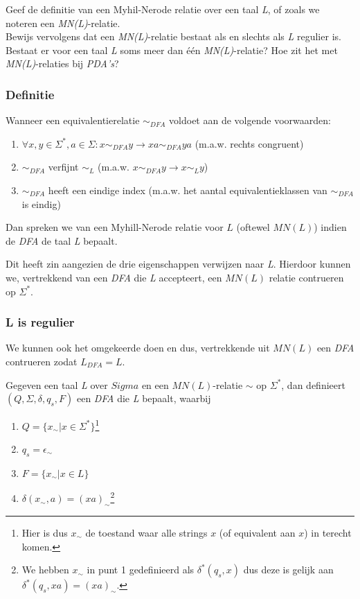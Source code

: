 
\begin{quest}[Vraag 5]
  Geef de definitie van een Myhil-Nerode relatie over een taal \emph{L}, of zoals we noteren een \emph{MN(L)}-relatie. \\
  Bewijs vervolgens dat een \emph{MN(L)}-relatie bestaat als en slechts als \emph{L} regulier is. Bestaat er voor een taal \emph{L} soms meer dan één \emph{MN(L)}-relatie? Hoe zit het met \emph{MN(L)}-relaties bij \emph{PDA’s}?
\end{quest}

\subsubsection*{Definitie}

\begin{theorem}
  Wanneer een equivalentierelatie $\sim_{DFA}$ voldoet aan de volgende voorwaarden:
  \begin{enumerate}
    \item $\forall x, y \in \Sigma^*, a \in \Sigma : x \sim_{DFA} y \rightarrow xa \sim_{DFA} ya$ (m.a.w. rechts congruent)
    \item $\sim_{DFA}$ verfijnt $\sim_L$ (m.a.w. $x \sim_{DFA} y \rightarrow x \sim_L y$)
    \item $\sim_{DFA}$ heeft een eindige index (m.a.w. het aantal equivalentieklassen van $\sim_{DFA}$ is eindig)
  \end{enumerate}
  Dan spreken we van een Myhill-Nerode relatie voor $L$ (oftewel $MN(L)$) indien de \emph{DFA} de taal \emph{L} bepaalt.
\end{theorem}

Dit heeft zin aangezien de drie eigenschappen verwijzen naar \emph{L}. Hierdoor kunnen we, vertrekkend van een \emph{DFA} die \emph{L} accepteert, een $MN(L)$ relatie contrueren op $\Sigma^*$.

\subsubsection*{L is regulier}

We kunnen ook het omgekeerde doen en dus, vertrekkende uit $MN(L)$ een \emph{DFA} contrueren zodat $L_{DFA} = L$.

\begin{theorem}
  Gegeven een taal \emph{L} over $Sigma$ en een $MN(L)$-relatie $\sim$ op $\Sigma^*$, dan definieert $(Q,\Sigma,\delta,q_s,F)$ een \emph{DFA} die \emph{L} bepaalt, waarbij
  \begin{enumerate}
    \item $Q = \{x_{\sim}|x \in \Sigma^*\}$\footnote{Hier is dus $x_{\sim}$ de toestand waar alle strings $x$ (of equivalent aan $x$) in terecht komen.}
    \item $q_s = \epsilon_{\sim}$
    \item $F = \{x_{\sim}|x \in L\}$
    \item $\delta(x_{\sim},a) = (xa)_{\sim}$\footnote{We hebben $x_{\sim}$ in punt 1 gedefinieerd als $\delta^*(q_s,x)$ dus deze is gelijk aan $\delta^*(q_s,xa) = (xa)_{\sim}$.}
  \end{enumerate}
\end{theorem}

